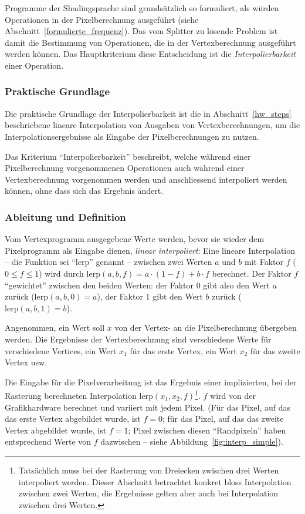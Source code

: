 \documentclass[twoside,a4paper,fleqn,12pt]{book}
\begin{document}
Programme der Shadingsprache sind grundsätzlich so formuliert, als würden Operationen in der Pixelberechnung ausgeführt (siehe Abschnitt~\ref{formulierte_frequenz}).
Das vom Splitter zu lösende Problem ist damit die Bestimmung von Operationen, die in der Vertexberechnung ausgeführt werden können.
Das Hauptkriterium diese Entscheidung ist die \emph{Interpolierbarkeit} einer Operation.

\subsubsection{Praktische Grundlage}

Die praktische Grundlage der Interpolierbarkeit ist die in Abschnitt~\ref{hw_steps} beschriebene lineare Interpolation von Ausgaben
von Vertexberechnungen, um die Interpolationsergebnisse als Eingabe der Pixelberechnungen zu nutzen.

Das Kriterium "`Interpolierbarkeit"' beschreibt, welche während einer Pixelberechnung vorgenommenen Operationen
auch während einer Vertexberechnung vorgenommen werden und anschliessend interpoliert werden können, ohne dass sich das Ergebnis ändert.

\subsubsection{Ableitung und Definition}
\newcommand\lerp{\mathrm{lerp}}
Vom Vertexprogramm ausgegebene Werte werden, bevor sie wieder dem Pixelprogramm als Eingabe dienen, \emph{linear interpoliert}: %
Eine lineare Interpolation -- die Funktion sei "`$\lerp$"' genannt -- zwischen zwei Werten $a$ und $b$ mit Faktor $f$ ($0 \le f \le 1$) wird durch $\lerp(a, b, f) = a \cdot (1-f) + b \cdot f$ berechnet.
Der Faktor $f$ "`gewichtet"' zwischen den beiden Werten: der Faktor $0$ gibt also den Wert $a$ zurück ($\lerp(a, b, 0) = a$),
der Faktor $1$ gibt den Wert $b$ zurück ($\lerp(a, b, 1) = b$).

Angenommen, ein Wert soll $x$ von der Vertex- an die Pixelberechnung übergeben werden.
Die Ergebnisse der Vertexberechnung sind verschiedene Werte für verschiedene Vertices, ein Wert $x_1$ für das erste Vertex, ein Wert $x_2$ für das zweite Vertex usw.

Die Eingabe für die Pixelverarbeitung ist das Ergebnis einer implizierten, bei der Rasterung berechneten Interpolation $\lerp(x_1, x_2, f)$\footnote{Tatsächlich muss bei der Rasterung von Dreiecken zwischen drei Werten interpoliert werden. Dieser Abschnitt betrachtet konkret
bloss Interpolation zwischen zwei Werten, die Ergebnisse gelten aber auch bei Interpolation zwischen drei Werten.}.
$f$ wird von der Grafikhardware berechnet und variiert mit jedem Pixel. (Für das Pixel, auf das das erste Vertex abgebildet wurde, ist $f = 0$; für das Pixel,
auf das das zweite Vertex abgebildet wurde, ist $f = 1$; Pixel zwischen diesen "`Randpixeln"' haben entsprechend Werte von $f$ dazwischen -- siehe Abbildung~\ref{fig:interp_simple}).
\end{document}

